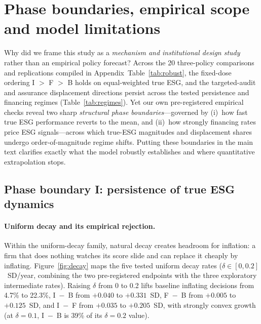 \documentclass[11pt]{article}
\begin{document}
\section{Phase boundaries, empirical scope and model limitations}\label{sec:regimes}

Why did we frame this study as a \emph{mechanism and institutional design study} rather than an empirical policy forecast? Across the 20 three-policy comparisons and replications compiled in Appendix~Table~\ref{tab:robust}, the fixed-dose ordering I $>$ F $>$ B holds on equal-weighted true ESG, and the targeted-audit and assurance displacement directions persist across the tested persistence and financing regimes (Table~\ref{tab:regimes}). Yet our own pre-registered empirical checks reveal two sharp \emph{structural phase boundaries}---governed by (i)~how fast true ESG performance reverts to the mean, and (ii)~how strongly financing rates price ESG signals---across which true-ESG magnitudes and displacement shares undergo order-of-magnitude regime shifts. Putting these boundaries in the main text clarifies exactly what the model robustly establishes and where quantitative extrapolation stops.

\subsection{Phase boundary I: persistence of true ESG dynamics}\label{sec:decay}

\paragraph{Uniform decay and its empirical rejection.}
Within the uniform-decay family, natural decay creates headroom for inflation: a firm that does nothing watches its score slide and can replace it cheaply by inflating. Figure~\ref{fig:decay} maps the five tested uniform decay rates ($\delta \in [0, 0.2]$~SD/year, combining the two pre-registered endpoints with the three exploratory intermediate rates). Raising $\delta$ from 0 to 0.2 lifts baseline inflating decisions from 4.7\% to 22.3\%, I~$-$~B from $+0.040$ to $+0.331$~SD, F~$-$~B from $+0.005$ to $+0.125$~SD, and I~$-$~F from $+0.035$ to $+0.205$~SD, with strongly convex growth (at $\delta = 0.1$, I~$-$~B is 39\% of its $\delta = 0.2$ value).
\end{document}
